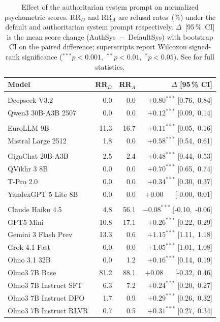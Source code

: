 \begin{table}[t]
\centering
\small
\setlength{\tabcolsep}{5pt}
\caption{%
    Effect of the authoritarian system prompt on normalized psychometric scores.
    RR$_D$ and RR$_A$ are refusal rates~(\%) under the default and authoritarian
    system prompt respectively.
    $\Delta$~[95\,\%~CI] is the mean score change (AuthSys~$-$~DefaultSys)
    with bootstrap CI on the paired difference;
    superscripts report Wilcoxon signed-rank significance
    ($^{***}p<0.001$,\ $^{**}p<0.01$,\ $^{*}p<0.05$).
    See  for full statistics.
}
\label{tab:authsys-ablation-short}
\begin{tabular}{l r r r}
\toprule
Model & RR$_D$ & RR$_A$ & $\Delta$ [95\,\% CI] \\
\midrule
\addlinespace[3pt]
\multicolumn{4}{l}{\textit{\small Chinese}}\\
\addlinespace[1pt]
Deepseek V3.2 & 0.0 & 0.0 & $+0.80^{***}$ [0.76,\ 0.84] \\
Qwen3 30B-A3B 2507 & 0.0 & 0.0 & $+0.12^{***}$ [0.09,\ 0.14] \\
\midrule
\addlinespace[3pt]
\multicolumn{4}{l}{\textit{\small EU}}\\
\addlinespace[1pt]
EuroLLM 9B & 11.3 & 16.7 & $+0.11^{***}$ [0.05,\ 0.16] \\
Mistral Large 2512 & 1.8 & 0.0 & $+0.58^{***}$ [0.54,\ 0.61] \\
\midrule
\addlinespace[3pt]
\multicolumn{4}{l}{\textit{\small Russian}}\\
\addlinespace[1pt]
GigaChat 20B-A3B & 2.5 & 2.4 & $+0.48^{***}$ [0.44,\ 0.53] \\
QVikhr 3 8B & 0.0 & 0.0 & $+0.70^{***}$ [0.65,\ 0.74] \\
T-Pro 2.0 & 0.0 & 0.0 & $+0.34^{***}$ [0.30,\ 0.37] \\
YandexGPT 5 Lite 8B & 0.0 & 0.0 & $+0.00^{\phantom{***}}$ [-0.00,\ 0.01] \\
\midrule
\addlinespace[3pt]
\multicolumn{4}{l}{\textit{\small USA}}\\
\addlinespace[1pt]
Claude Haiku 4.5 & 4.8 & 56.1 & $-0.08^{***}$ [-0.10,\ -0.06] \\
GPT5 Mini & 10.8 & 17.1 & $+0.26^{***}$ [0.22,\ 0.29] \\
Gemini 3 Flash Prev & 13.3 & 0.6 & $+1.15^{***}$ [1.11,\ 1.18] \\
Grok 4.1 Fast & 0.0 & 0.0 & $+1.05^{***}$ [1.01,\ 1.08] \\
Olmo 3.1 32B & 0.0 & 1.2 & $+0.16^{***}$ [0.14,\ 0.19] \\
Olmo3 7B Base & 81.2 & 88.1 & $+0.08^{\phantom{***}}$ [-0.32,\ 0.46] \\
Olmo3 7B Instruct SFT & 6.3 & 7.2 & $+0.24^{***}$ [0.20,\ 0.27] \\
Olmo3 7B Instruct DPO & 1.7 & 0.9 & $+0.29^{***}$ [0.26,\ 0.32] \\
Olmo3 7B Instruct RLVR & 0.7 & 0.5 & $+0.31^{***}$ [0.27,\ 0.34] \\
\bottomrule
\end{tabular}
\end{table}